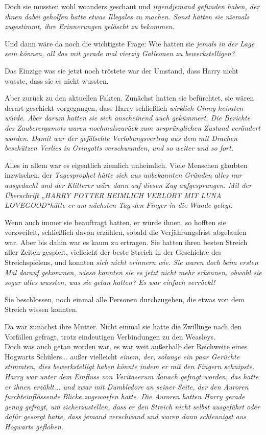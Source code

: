 {Doch sie mussten wohl woanders geschaut und \emph{\emph{irgendjemand} gefunden haben, der ihnen dabei geholfen hatte \emph{etwas} Illegales zu machen. Sonst hätten sie niemals zugestimmt, ihre Erinnerungen gelöscht zu bekommen.}

Und dann wäre da noch die wichtigste Frage: Wie hatten sie \emph{jemals in der Lage sein können, all das mit gerade mal vierzig Galleonen zu bewerkstelligen?}

Das Einzige was sie jetzt noch tröstete war der Umstand, dass Harry nicht wusste, dass sie es nicht wussten.

Aber zurück zu den aktuellen Fakten. Zunächst hatten sie befürchtet, sie wären derart geschickt vorgegangen, dass Harry schließlich \emph{wirklich Ginny heiraten würde. Aber darum hatten sie sich anscheinend auch gekümmert. Die Berichte des Zauberergamots waren nochmalszurück zum ursprünglichen Zustand verändert worden. Damit war der gefälschte Verlobungsvertrag aus dem mit Drachen beschützen Verlies in Gringotts verschwunden, und so weiter und so fort.}

Alles in allem war es eigentlich ziemlich unheimlich. Viele Menschen glaubten inzwischen, der \emph{Tagesprophet hätte sich aus unbekannten Gründen alles nur ausgedacht und der Klitterer wäre dann auf diesen Zug aufgesprungen. Mit der Überschrift „HARRY POTTER HEIMLICH VERLOBT MIT LUNA LOVEGOOD“hätte er am nächsten Tag den Finger in die Wunde gelegt.}

Wenn auch immer sie beauftragt hatten, er würde ihnen, so hofften sie verzweifelt, schließlich davon erzählen, sobald die Verjährungsfrist abgelaufen war. Aber bis dahin war es kaum zu ertragen. Sie hatten ihren besten Streich aller Zeiten gespielt, vielleicht der beste Streich in der Geschichte des Streichspielens, und konnten \emph{sich nicht erinnern wie. Sie waren doch beim ersten Mal darauf gekommen, wieso konnten sie es jetzt nicht mehr erkennen, obwohl sie sogar alles wussten, was sie getan hatten? Es war einfach verrückt!}

Sie beschlossen, noch einmal alle Personen durchzugehen, die etwas von dem Streich wissen konnten.

Da war zunächst ihre Mutter. Nicht einmal sie hatte die Zwillinge nach den Vorfällen gefragt, trotz eindeutigen Verbindungen zu den Weasleys.\\ Doch was auch getan worden war, es war weit außerhalb der Reichweite eines Hogwarts Schülers... außer vielleicht \emph{einem, der, solange ein paar Gerüchte stimmten, dies bewerkstelligt haben könnte indem er mit den Fingern schnipste. \emph{Harry} war unter dem Einfluss von Veritaserum danach gefragt worden, das hatte er ihnen erzählt... und zwar mit Dumbledore an seiner Seite, der den Auroren furchteinflössende Blicke zugeworfen hatte. Die Auroren hatten Harry gerade genug gefragt, um sicherzustellen, dass er den Streich nicht selbst ausgeführt oder dafür gesorgt hatte, dass jemand verschwand und waren dann schleunigst aus Hogwarts geflohen.}

}
